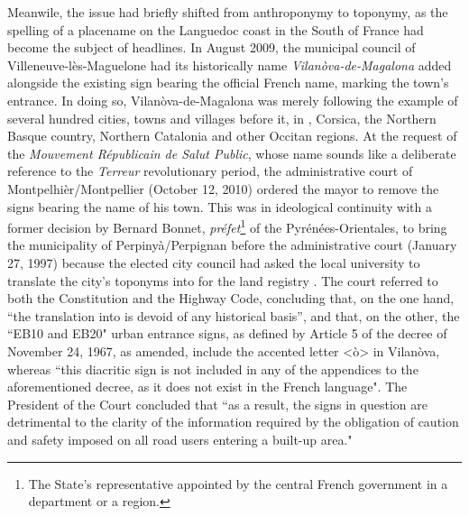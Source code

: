 \documentclass[output=paper,colorlinks,citecolor=brown]{langscibook}
\begin{document}
Meanwile, the issue had briefly shifted from anthroponymy to toponymy, as the  spelling of a placename on the Languedoc coast in the South of France had become the subject of headlines. In August 2009, the municipal council of Villeneuve-lès-Maguelone had its historically  name \textit{Vilanòva-de-Magalona} added alongside the existing sign bearing the official French name, marking the town’s entrance. In doing so, Vilanòva-de-Magalona was merely following the example of several hundred cities, towns and villages before it, in , Corsica, the Northern Basque country, Northern Catalonia and other Occitan regions. At the request of the \textit{Mouvement Républicain de Salut Public}, whose name sounds like a deliberate reference to the \textit{Terreur} revolutionary period, the administrative court of Montpelhièr/Montpellier (October 12, 2010) ordered the mayor to remove the signs bearing the  name of his town. This was in ideological continuity with a former decision by Bernard Bonnet, \textit{préfet}\footnote{The State’s representative appointed by the central French government in a department or a region.} of the Pyrénées-Orientales, to bring the municipality of Perpinyà/Perpignan before the administrative court (January 27, 1997) because the elected city council had asked the local university to translate the city's toponyms into  for the land registry \citep{sm:Duran2000}. The court referred to both the Constitution and the Highway Code, concluding that, on the one hand, “the translation into  is devoid of any historical basis”, and that, on the other, the ``EB10 and EB20" urban entrance signs, as defined by Article 5 of the decree of November 24, 1967, as amended, include the accented letter <ò> in Vilanòva, whereas ``this diacritic sign is not included in any of the appendices to the aforementioned decree, as it does not exist in the French language". The President of the Court concluded that ``as a result, the signs in question are detrimental to the clarity of the information required by the obligation of caution and safety imposed on all road users entering a built-up area." 
\end{document}
